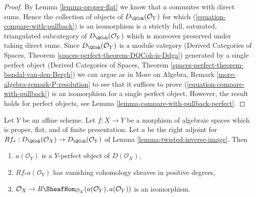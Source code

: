 \begin{proof}
By Lemma \ref{lemma-proper-flat} we know that $a$ commutes
with direct sums. Hence the collection of objects of
$D_\QCoh(\mathcal{O}_Y)$ for which (\ref{equation-compare-with-pullback})
is an isomorphism is a strictly full, saturated, triangulated
subcategory of $D_\QCoh(\mathcal{O}_Y)$ which is moreover
preserved under taking direct sums. Since $D_\QCoh(\mathcal{O}_Y)$
is a module category (Derived Categories of Spaces, Theorem
\ref{spaces-perfect-theorem-DQCoh-is-Ddga}) generated by a single
perfect object (Derived Categories of Spaces, Theorem
\ref{spaces-perfect-theorem-bondal-van-den-Bergh})
we can argue as in
More on Algebra, Remark \ref{more-algebra-remark-P-resolution}
to see that it suffices to prove (\ref{equation-compare-with-pullback})
is an isomorphism for a single perfect object.
However, the result holds for perfect objects, see
Lemma \ref{lemma-compare-with-pullback-perfect}.
\end{proof}

\begin{lemma}
\label{lemma-properties-relative-dualizing}
Let $Y$ be an affine scheme. Let $f : X \to Y$ be a morphism of
algebraic spaces which is proper, flat, and of finite presentation.
Let $a$ be the right adjoint for
$Rf_* : D_\QCoh(\mathcal{O}_X) \to D_\QCoh(\mathcal{O}_Y)$ of
Lemma \ref{lemma-twisted-inverse-image}.
Then
\begin{enumerate}
\item $a(\mathcal{O}_Y)$ is a $Y$-perfect object of $D(\mathcal{O}_X)$,
\item $Rf_*a(\mathcal{O}_Y)$ has vanishing cohomology sheaves
in positive degrees,
\item $\mathcal{O}_X \to
R\SheafHom_{\mathcal{O}_X}(a(\mathcal{O}_Y), a(\mathcal{O}_Y))$
is an isomorphism.
\end{enumerate}
\end{lemma}

